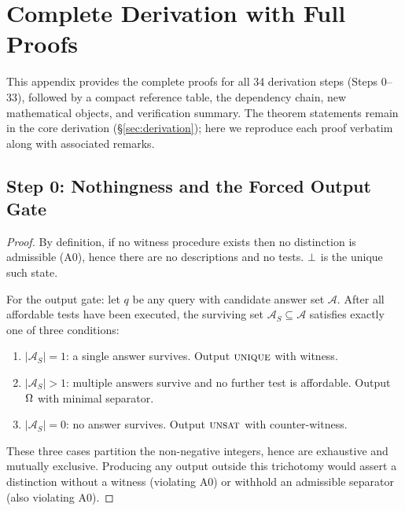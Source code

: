 \section{Complete Derivation with Full Proofs}
\label{app:derivation}

This appendix provides the complete proofs for all 34 derivation steps (Steps 0--33), followed by a compact reference table, the dependency chain, new mathematical objects, and verification summary. The theorem statements remain in the core derivation (\S\ref{sec:derivation}); here we reproduce each proof verbatim along with associated remarks.


\subsection{Step 0: Nothingness and the Forced Output Gate}\label{app:step0}

\begin{proof}
By definition, if no witness procedure exists then no distinction is
admissible (A0), hence there are no descriptions and no tests.  $\bot$ is
the unique such state.

For the output gate: let $q$ be any query with candidate answer set
$\mathcal{A}$.  After all affordable tests have been executed, the surviving
set $\mathcal{A}_S \subseteq \mathcal{A}$ satisfies exactly one of three
conditions:
\begin{enumerate}[nosep]
  \item $|\mathcal{A}_S| = 1$: a single answer survives.  Output $\textsc{unique}$
        with witness.
  \item $|\mathcal{A}_S| > 1$: multiple answers survive and no further test
        is affordable.  Output $\Omega$ with minimal separator.
  \item $|\mathcal{A}_S| = 0$: no answer survives.  Output $\textsc{unsat}$ with
        counter-witness.
\end{enumerate}
These three cases partition the non-negative integers, hence are exhaustive
and mutually exclusive.  Producing any output outside this trichotomy would
assert a distinction without a witness (violating A0) or withhold an
admissible separator (also violating A0).

\end{proof}

